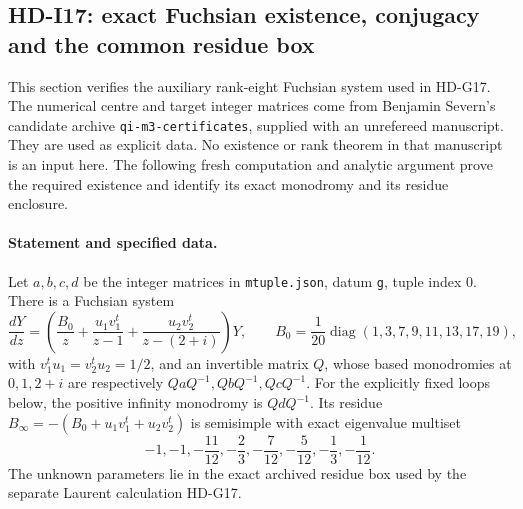 \subsection{HD-I17: exact Fuchsian existence, conjugacy and the common residue box}
\label{sec:HD-I17}

This section verifies the auxiliary rank-eight Fuchsian system used
in HD-G17.  The numerical centre and target integer matrices come
from Benjamin Severn's candidate archive
\texttt{qi-m3-certificates}, supplied with an unrefereed manuscript.
They are used as explicit data.  No existence or rank theorem in
that manuscript is an input here.  The following fresh computation
and analytic argument prove the required existence and identify
its exact monodromy and its residue enclosure.

\paragraph{Statement and specified data.}
Let $a,b,c,d$ be the integer matrices in \texttt{mtuple.json},
datum \texttt{g}, tuple index $0$.  There is a Fuchsian system
\begin{equation}
 \frac{dY}{dz}=
 \left(\frac{B_0}{z}+\frac{u_1v_1^t}{z-1}
                         +\frac{u_2v_2^t}{z-(2+i)}\right)Y,
 \qquad
 B_0=\frac1{20}\operatorname{diag}(1,3,7,9,11,13,17,19),
                                                        \tag{I17.1}
\end{equation}
with $v_1^tu_1=v_2^tu_2=1/2$, and an invertible matrix $Q$,
whose based monodromies at $0,1,2+i$ are respectively
$QaQ^{-1},QbQ^{-1},QcQ^{-1}$.  For the explicitly fixed loops
below, the positive infinity monodromy is $QdQ^{-1}$.
Its residue
$B_\infty=-(B_0+u_1v_1^t+u_2v_2^t)$ is semisimple with exact
eigenvalue multiset
\begin{equation}
 -1,-1,-\frac{11}{12},-\frac23,-\frac7{12},
               -\frac5{12},-\frac13,-\frac1{12}.       \tag{I17.2}
\end{equation}
The unknown parameters lie in the exact archived residue box
used by the separate Laurent calculation HD-G17.


